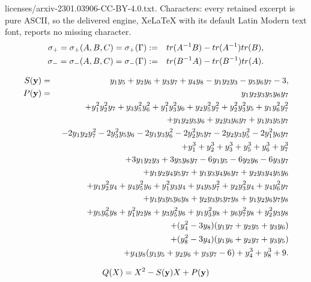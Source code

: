 \documentclass[10pt,a4paper]{amsart}
\begin{document}
licenses/arxiv-2301.03906-CC-BY-4.0.txt. Characters: every retained excerpt is pure ASCII, so the delivered engine, XeLaTeX with its default Latin Modern text font, reports no missing character.
\begin{eqnarray}
\sigma_+=\sigma_+(A,B,C)=\sigma_+(\Gamma) &:= & {\rm tr}(A^{-1}B)-{\rm tr}(A^{-1}){\rm tr}(B), \label{eq:shape+} \\
\sigma_-=\sigma_-(A,B,C)=\sigma_-(\Gamma) &:= &{\rm tr}(B^{-1}A)-{\rm tr}(B^{-1}){\rm tr}(A). \label{eq:shape-}
\end{eqnarray}	

\begin{eqnarray}
\label{eq:S-y} S({\bf y}) & = & y_1y_5+y_2y_6+y_3y_7+y_4y_8 -y_1y_2y_3-y_5y_6y_7-3, \\
\label{eq:P-y}P({\bf y}) & = & y_1y_2y_3y_5y_6y_7 \\
\nonumber && \ 
+ y_1^2y_2^2y_7 + y_3y_5^2y_6^2
+y_1^2y_3^2y_6  + y_2y_5^2y_7^2
+y_2^2y_3^2y_5  + y_1y_6^2y_7^2 \\
\nonumber && \ 
+y_1y_2y_5y_6+y_2y_3y_6y_7+y_1y_3y_5y_7 \\
\nonumber && \ 
 -2y_1y_2y_7^2 - 2y_3^2y_5y_6
 -2y_1y_3y_6^2 - 2y_2^2y_5y_7
 -2 y_2y_3y_5^2 - 2 y_1^2y_6y_7 \\
 \nonumber && \ 
 +y_1^3+y_2^3+y_3^3+y_5^3+y_6^3+y_7^3 \\
 \nonumber && \ 
 + 3y_1y_2y_3+3y_5y_6y_7-6y_1y_5 -6y_2y_6 -6y_3y_7 \\
 \nonumber && \ 
 +y_1y_2y_4y_5y_7 + y_1y_3y_4y_6y_7 + y_2y_3y_4y_5y_6 \\
 \nonumber && \ 
 +y_1y_2^2y_4 + y_4y_5^2y_6 + y_1^2y_3y_4 + y_4y_5y_7^2+y_2y_3^2y_4+y_4y_6^2y_7 \\
 \nonumber &&  \ 
 +y_1y_3y_5y_6y_8 + y_2y_3y_5y_7y_8 + y_1y_2y_6y_7y_8 \\
 \nonumber && \ 
 +y_5y_6^2y_8 + y_1^2y_2y_8 + y_3y_5^2y_6+y_1y_3^2y_8 + y_6y_7^2y_8+y_2^2y_3y_8 \\
 \nonumber && \ 
 +(y_4^2-3y_8)(y_1y_7+y_2y_5+y_3y_6) \\
 \nonumber && \ 
 +(y_8^2-3y_4)(y_1y_6+y_2y_7+y_3y_5) \\
 \nonumber && \ 
 +y_4y_8(y_1y_5+y_2y_6+y_3y_7-6)+y_4^3+y_8^3+9.
\end{eqnarray}

	\begin{equation}\label{eqn:Q-y}
		Q(X)=X^2-S({\bf y})X+P({\bf y})
	\end{equation}
\end{document}
